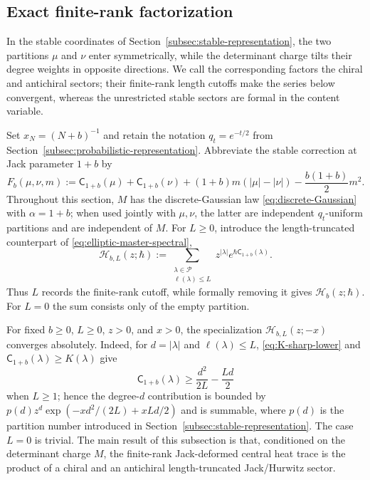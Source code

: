 \documentclass[11pt,a4paper,reqno]{article}
\theoremstyle{definition}
\theoremstyle{remark}
\newcommand\cA{{\mathsf C}}
\newcommand\Pcal{{\mathcal P}}
\newcommand\ellpart{{\ell}}
\begin{document}
\subsection{Exact finite-rank factorization}\label{subsec:finite-rank-factorization}
In the stable coordinates of Section~\ref{subsec:stable-representation}, the two partitions $\mu$ and $\nu$ enter symmetrically, while the determinant charge tilts their degree weights in opposite directions.  We call the corresponding factors the chiral and antichiral sectors; their finite-rank length cutoffs make the series below convergent, whereas the unrestricted stable sectors are formal in the content variable.

Set $x_N=(N+b)^{-1}$ and retain the notation $q_t=e^{-t/2}$ from Section~\ref{subsec:probabilistic-representation}.  Abbreviate the stable correction at Jack parameter $1+b$ by
\begin{equation}\label{eq:Fb}
F_b(\mu,\nu,m) :=\cA_{1+b}(\mu)+\cA_{1+b}(\nu) +(1+b)m(|\mu|-|\nu|) -\frac{b(1+b)}{2}m^2.
\end{equation}
Throughout this section, $M$ has the discrete-Gaussian law \eqref{eq:discrete-Gaussian} with $\alpha=1+b$; when used jointly with $\mu,\nu$, the latter are independent $q_t$-uniform partitions and are independent of $M$.
For $L\geq0$, introduce the length-truncated counterpart of \eqref{eq:elliptic-master-spectral},
\begin{equation}\label{eq:finite-Hurwitz-sector}
\mathscr H_{b,L}(z;\hbar):=\sum_{\substack{\lambda\in\Pcal\\ \ellpart(\lambda)\leq L}}z^{|\lambda|}e^{\hbar\cA_{1+b}(\lambda)}.
\end{equation}
Thus $L$ records the finite-rank cutoff, while formally removing it gives $\mathscr H_b(z;\hbar)$.  For $L=0$ the sum consists only of the empty partition.

For fixed $b\geq0$, $L\geq0$, $z>0$, and $x>0$, the specialization $\mathscr H_{b,L}(z;-x)$ converges absolutely.  Indeed, for $d=|\lambda|$ and $\ellpart(\lambda)\leq L$, \eqref{eq:K-sharp-lower} and $\cA_{1+b}(\lambda)\geq K(\lambda)$ give
\[
\cA_{1+b}(\lambda)\geq \frac{d^2}{2L}-\frac{Ld}{2}
\]
when $L\geq1$; hence the degree-$d$ contribution is bounded by
$p(d)z^d\exp(-xd^2/(2L)+xLd/2)$ and is summable, where $p(d)$ is the partition number introduced in Section~\ref{subsec:stable-representation}.  The case $L=0$ is trivial.  The main result of this subsection is that, conditioned on the determinant charge $M$, the finite-rank Jack-deformed central heat trace is the product of a chiral and an antichiral length-truncated Jack/Hurwitz sector.
\end{document}
